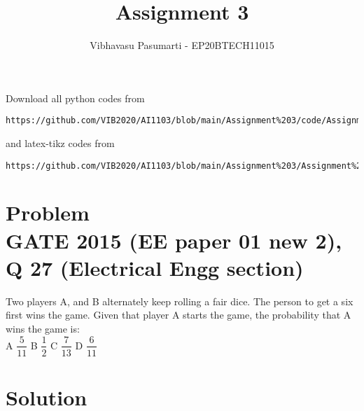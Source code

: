 \documentclass[journal,12pt,twocolumn]{IEEEtran}
\theoremstyle{remark}
\numberwithin{equation}{subsection}
\renewcommand{\thefigure}{\theproblem}
\begin{document}
\title{Assignment 3}
\author{Vibhavasu Pasumarti - EP20BTECH11015}
\maketitle
\newpage
\bigskip
\renewcommand{\thefigure}{\theenumi}
\renewcommand{\thetable}{\theenumi}
Download all python codes from 
\begin{lstlisting}
https://github.com/VIB2020/AI1103/blob/main/Assignment%203/code/Assignment%203.py
\end{lstlisting}
%
and latex-tikz codes from 
%
\begin{lstlisting}
https://github.com/VIB2020/AI1103/blob/main/Assignment%203/Assignment%203.pdf
\end{lstlisting}
\section{\Large Problem \\ \large GATE 2015 (EE paper 01 new 2), Q 27 (Electrical Engg section)}
Two players A, and B alternately keep rolling a fair dice. The person to get a six first wins the game. Given that player A starts the game, the probability that A wins the game is:\\[5pt]
    A $\dfrac{5}{11}$ \hspace{1cm}
    B $\dfrac{1}{2}$ \hspace{1cm}
    C $\dfrac{7}{13}$ \hspace{1cm}
    D $\dfrac{6}{11}$ \hspace{1cm}
\section{\Large Solution}
\end{document}
